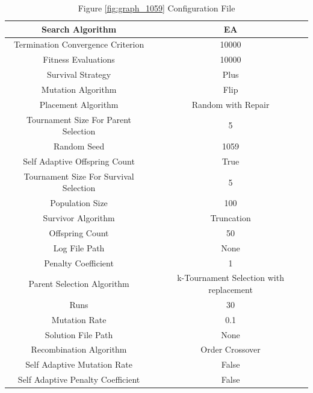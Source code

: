 \documentclass{standalone}
\begin{document}
\begin{table}[!htb]
	\centering
	\caption{Figure \ref{fig:graph_1059} Configuration File}
	\label{tab:graph_1059}
	\begin{tabular}{| c | c |}
		\hline
		Search Algorithm		& EA		 \\
		\hline
		Termination Convergence Criterion		& 10000		 \\
		\hline
		Fitness Evaluations		& 10000		 \\
		\hline
		Survival Strategy		& Plus		 \\
		\hline
		Mutation Algorithm		& Flip		 \\
		\hline
		Placement Algorithm		& Random with Repair		 \\
		\hline
		Tournament Size For Parent Selection		& 5		 \\
		\hline
		Random Seed		& 1059		 \\
		\hline
		Self Adaptive Offspring Count		& True		 \\
		\hline
		Tournament Size For Survival Selection		& 5		 \\
		\hline
		Population Size		& 100		 \\
		\hline
		Survivor Algorithm		& Truncation		 \\
		\hline
		Offspring Count		& 50		 \\
		\hline
		Log File Path		& None		 \\
		\hline
		Penalty Coefficient		& 1		 \\
		\hline
		Parent Selection Algorithm		& k-Tournament Selection with replacement		 \\
		\hline
		Runs		& 30		 \\
		\hline
		Mutation Rate		& 0.1		 \\
		\hline
		Solution File Path		& None		 \\
		\hline
		Recombination Algorithm		& Order Crossover		 \\
		\hline
		Self Adaptive Mutation Rate		& False		 \\
		\hline
		Self Adaptive Penalty Coefficient		& False		 \\
		\hline
	\end{tabular}
\end{table}
\end{document}
